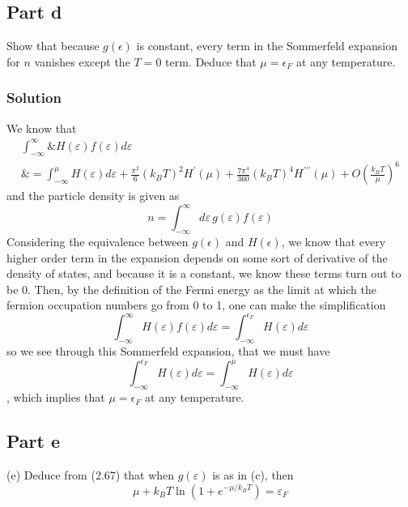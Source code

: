 \documentclass[12pt]{article}
\begin{document}
\subsection{Part d}
Show that because \( g(\epsilon) \) is constant, every term in the Sommerfeld expansion for \( n \) vanishes except the \( T = 0 \) term. Deduce that \( \mu = \epsilon_F \) at any temperature.

\subsubsection{Solution}
We know that
\begin{equation}
    \begin{aligned}
\int_{-\infty}^{\infty} \& H(\varepsilon) f(\varepsilon) d \varepsilon \\
\& = \int_{-\infty}^\mu H(\varepsilon) d \varepsilon + \frac{\pi^2}{6}\left(k_B T\right)^2 H^{\prime}(\mu) + \frac{7 \pi^4}{360}\left(k_B T\right)^4 H^{\prime \prime \prime}(\mu) + O\left(\frac{k_B T}{\mu}\right)^6
\end{aligned}
\end{equation}
and the particle density is given as
\begin{equation}
    n = \int_{-\infty}^{\infty} d \varepsilon \, g(\varepsilon) f(\varepsilon)
\end{equation}
Considering the equivalence between \( g(\epsilon) \) and \( H(\epsilon) \), we know that every higher order term in the expansion depends on some sort of derivative of the density of states, and because it is a constant, we know these terms turn out to be 0. Then, by the definition of the Fermi energy as the limit at which the fermion occupation numbers go from 0 to 1, one can make the simplification
\begin{equation}
    \int_{-\infty}^{\infty} H(\varepsilon) f(\varepsilon) d \varepsilon = \int_{-\infty}^{\epsilon_F} H(\varepsilon) d \varepsilon
\end{equation}
so we see through this Sommerfeld expansion, that we must have
\begin{equation}
    \int_{-\infty}^{\epsilon_F} H(\varepsilon) d \varepsilon = \int_{-\infty}^{\mu } H(\varepsilon) d \varepsilon
\end{equation}
, which implies that \( \mu = \epsilon_F \) at any temperature.
\subsection{Part e}
(e) Deduce from (2.67) that when \( g(\varepsilon) \) is as in (c), then
\[
\mu + k_B T \ln \left(1 + e^{-\mu  / k_B T}\right) = \varepsilon_F
\]
\end{document}

